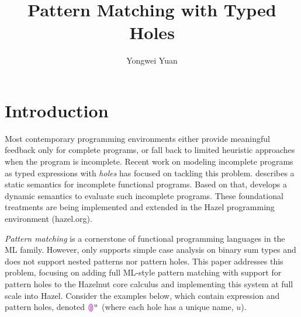 \documentclass[acmsmall,screen,review,nonacm]{acmart}
\theoremstyle{slplain}
\numberwithin{thm}{section}
\begin{document}
  
\title{Pattern Matching with Typed Holes}

\author{Yongwei Yuan}


\maketitle

\section{Introduction}
\label{sec:intro}
Most contemporary programming environments either provide meaningful feedback only for complete programs, or fall back to limited heuristic approaches when the program is incomplete.
Recent work on modeling incomplete programs as typed expressions with \emph{holes} has focused on tackling this problem. \citet{DBLP:conf/popl/OmarVHAH17} describes a static semantics for incomplete functional programs. Based on that, \citet{DBLP:journals/pacmpl/OmarVCH19} develops a dynamic semantics to evaluate such incomplete programs.
These foundational treatments are being implemented and extended in the Hazel programming environment (hazel.org).

\emph{Pattern matching} is a cornerstone of functional programming languages in the ML family. 
However, \citet{DBLP:journals/pacmpl/OmarVCH19} only supports simple case analysis on binary sum types and does not support nested patterns nor pattern holes.
This paper addresses this problem, focusing on adding full ML-style pattern matching with support for pattern holes to the Hazelnut core calculus and implementing 
this system at full scale into Hazel. Consider the examples below, which contain expression and pattern holes, denoted $\textcolor{violet}{\llparenthesis}\textcolor{violet}{\rrparenthesis}^{u}$ (where each hole has a unique name, $u$). 
\end{document}
